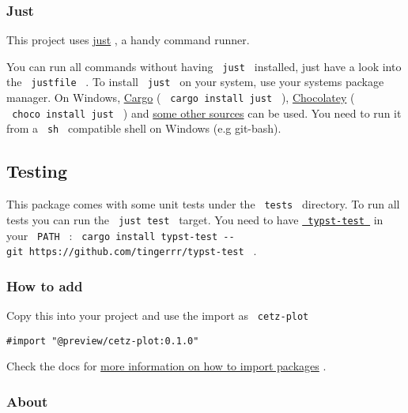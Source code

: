 \subsubsection{Just}\label{just}

This project uses \href{https://github.com/casey/just}{just} , a handy
command runner.

You can run all commands without having \texttt{\ just\ } installed,
just have a look into the \texttt{\ justfile\ } . To install
\texttt{\ just\ } on your system, use your systems package manager. On
Windows, \href{https://doc.rust-lang.org/cargo/}{Cargo} (
\texttt{\ cargo\ install\ just\ } ),
\href{https://chocolatey.org/}{Chocolatey} (
\texttt{\ choco\ install\ just\ } ) and
\href{https://just.systems/man/en/chapter_4.html}{some other sources}
can be used. You need to run it from a \texttt{\ sh\ } compatible shell
on Windows (e.g git-bash).

\subsection{Testing}\label{testing}

This package comes with some unit tests under the \texttt{\ tests\ }
directory. To run all tests you can run the \texttt{\ just\ test\ }
target. You need to have
\href{https://github.com/tingerrr/typst-test/}{\texttt{\ typst-test\ }}
in your \texttt{\ PATH\ } :
\texttt{\ cargo\ install\ typst-test\ -\/-git\ https://github.com/tingerrr/typst-test\ }
.

\subsubsection{How to add}\label{how-to-add}

Copy this into your project and use the import as \texttt{\ cetz-plot\ }

\begin{verbatim}
#import "@preview/cetz-plot:0.1.0"
\end{verbatim}



Check the docs for
\href{https://typst.app/docs/reference/scripting/\#packages}{more
information on how to import packages} .

\subsubsection{About}\label{about}

